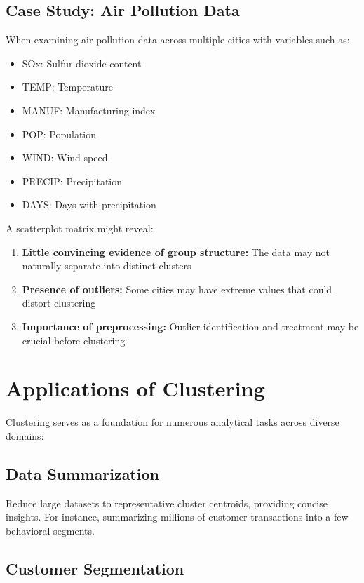 \documentclass[11pt]{article}
\begin{document}
\subsection{Case Study: Air Pollution Data}

When examining air pollution data across multiple cities with variables such as:
\begin{itemize}
    \item SOx: Sulfur dioxide content
    \item TEMP: Temperature
    \item MANUF: Manufacturing index
    \item POP: Population
    \item WIND: Wind speed
    \item PRECIP: Precipitation
    \item DAYS: Days with precipitation
\end{itemize}

A scatterplot matrix might reveal:
\begin{enumerate}
    \item \textbf{Little convincing evidence of group structure:} The data may not naturally separate into distinct clusters
    \item \textbf{Presence of outliers:} Some cities may have extreme values that could distort clustering
    \item \textbf{Importance of preprocessing:} Outlier identification and treatment may be crucial before clustering
\end{enumerate}

\section{Applications of Clustering}

Clustering serves as a foundation for numerous analytical tasks across diverse domains:

\subsection{Data Summarization}

Reduce large datasets to representative cluster centroids, providing concise insights. For instance, summarizing millions of customer transactions into a few behavioral segments.

\subsection{Customer Segmentation}
\end{document}
